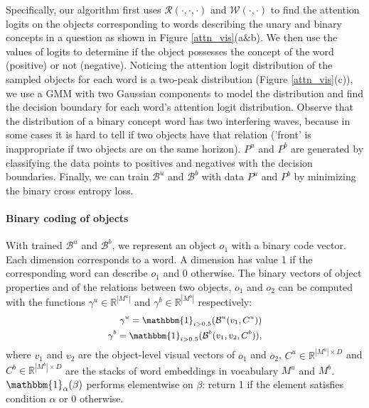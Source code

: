 \documentclass[10pt,twocolumn,letterpaper]{article}
\begin{document}
Specifically, our algorithm first uses $\mathcal{R}(\cdot,\cdot,\cdot)$ and $\mathcal{W}(\cdot,\cdot)$ to find the attention logits on the objects corresponding to words describing the unary and binary concepts in a question as shown in Figure \ref{attn_vis}(a\&b). 
We then use the values of logits to determine if the object possesses the concept of the word (positive) or not (negative).
Noticing the attention logit distribution of the sampled objects for each word is a two-peak distribution (Figure \ref{attn_vis}(c)), we use a GMM \cite{xuan2001algorithms} with two Gaussian components to model the distribution and find the decision boundary for each word's attention logit distribution. Observe that the distribution of a binary concept word has two interfering waves, because in some cases it is hard to tell if two objects have that relation ('front' is inappropriate if two objects are on the same horizon).
$P^u$ and $P^b$ are generated by classifying the data points to positives and negatives with the decision boundaries. 
Finally, we can train $\mathcal{B}^u$ and $\mathcal{B}^b$ with data $P^u$ and $P^b$ by minimizing the binary cross entropy loss.




\vspace{-5mm}
\paragraph{Binary coding of objects}
With trained $\mathcal{B}^u$ and $\mathcal{B}^b$, we represent an object $o_1$ with a binary code vector. Each dimension corresponds to a word. A dimension has value 1 if the corresponding word can describe $o_1$ and 0 otherwise. The binary vectors of object properties and of the relations between two objects, $o_1$ and $o_2$ can be computed with the functions $\gamma^u \in \mathbb{R}^{|M^u|}$ and $\gamma^b \in \mathbb{R}^{|M^b|}$ respectively:
\vspace{-2mm}
\begin{equation}
\small
\begin{split}
    \gamma^u = \mathbbm{1}_{i>0.5}(\mathcal{B}^u(v_1,C^u)) \\
    \gamma^b = \mathbbm{1}_{i>0.5}(\mathcal{B}^b(v_1,v_2,C^b)),
    \label{word_represent}
\end{split}
\vspace{-2mm}
\end{equation}
where $v_1$ and $v_2$ are the object-level visual vectors of $o_1$ and $o_2$, $C^u \in \mathbb{R}^{|M^u| \times D}$ and $C^b \in \mathbb{R}^{|M^b| \times D}$ are the stacks of word embeddings in vocabulary $M^u$ and $M^b$. $\mathbbm{1}_\alpha(\beta)$ performs elementwise on $\beta$: return 1 if the element satisfies condition $\alpha$ or 0 otherwise. 
\end{document}
